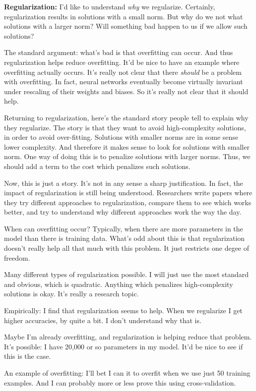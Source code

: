 \documentclass[12pt]{report}
\begin{document}
\textbf{Regularization:} I'd like to understand \emph{why} we
regularize.  Certainly, regularization results in solutions with a
small norm.  But why do we not what solutions with a larger norm?
Will something bad happen to us if we allow such solutions?

The standard argument: what's bad is that overfitting can occur.  And
thus regularization helps reduce overfitting.  It'd be nice to have an
example where overfitting actually occurs.  It's really not clear that
there \emph{should} be a problem with overfitting.  In fact, neural
networks eventually become virtually invariant under rescaling of
their weights and biases.  So it's really not clear that it should
help.

Returning to regularization, here's the standard story people tell to
explain why they regularize.  The story is that they want to avoid
high-complexity solutions, in order to avoid over-fitting.  Solutions
with smaller norms are in some sense lower complexity.  And therefore
it makes sense to look for solutions with smaller norm.  One way of
doing this is to penalize solutions with larger norms.  Thus, we
should add a term to the cost which penalizes such solutions.

Now, this is just a story.  It's not in any sense a sharp
justification.  In fact, the impact of regularization is still being
understood.  Researchers write papers where they try different
approaches to regularization, compare them to see which works better,
and try to understand why different approaches work the way the day.

When can overfitting occur?  Typically, when there are more parameters
in the model than there is training data.  What's odd about this is
that regularization doesn't really help all that much with this
problem.  It just restricts one degee of freedom.

Many different types of regularization possible.  I will just use the
most standard and obvious, which is quadratic.  Anything which
penalizes high-complexity solutions is okay.  It's really a research
topic.

Empirically: I find that regularization seems to help.  When we
regularize I get higher accuracies, by quite a bit.  I don't
understand why that is.

Maybe I'm already overfitting, and regularization is helping reduce
that problem.  It's possible: I have 20,000 or so parameters in my
model.  It'd be nice to see if this is the case.

An example of overfitting: I'll bet I can it to overfit when we use
just 50 training examples.  And I can probably more or less prove this
using cross-validation.
\end{document}

